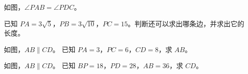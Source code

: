 \documentclass{exam-zh}
\begin{document}

\begin{problem}[points=10]
  \noindent
  \begin{minipage}[t]{\dimexpr\linewidth-60mm-6mm\relax}
    \vspace{0pt}
    如图，$\angle PAB=\angle PDC$。

已知 $PA=3\sqrt{5}$，$PB=3\sqrt{10}$，$PC=15$。判断还可以求出哪条边，并求出它的长度。
    
  \end{minipage}\hfill
  \begin{diagramcoltikz}{60mm}{}
  }
  \end{diagramcoltikz}
  \par\medskip
  \answerarea[54mm]
\end{problem}



\begin{problem}[points=10]
  \noindent
  \begin{minipage}[t]{\dimexpr\linewidth-60mm-6mm\relax}
    \vspace{0pt}
    如图，$AB\parallel CD$。
已知 $PA=3$，$PC=6$，$CD=8$，求 $AB$。
    
  \end{minipage}\hfill
  \begin{diagramcoltikz}{60mm}{}
  }
  \end{diagramcoltikz}
  \par\medskip
  \answerarea[42mm]
\end{problem}



\begin{problem}[points=10]
  \noindent
  \begin{minipage}[t]{\dimexpr\linewidth-60mm-6mm\relax}
    \vspace{0pt}
    如图，$AB\parallel CD$。
已知 $BP=18$，$PD=28$，$AB=36$，求 $CD$。
    
  \end{minipage}\hfill
  \begin{diagramcoltikz}{60mm}{}
  }
  \end{diagramcoltikz}
  \par\medskip
  \answerarea[42mm]
\end{problem}
\end{document}
